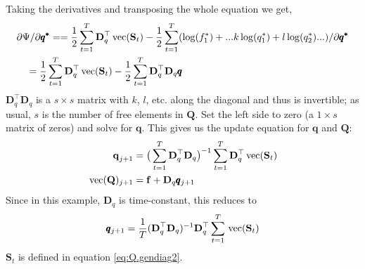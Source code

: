 \documentclass[]{article}
\def\DD{\mbox{$\mathbf D$}}	\def\dd{\mbox{$\mathbf d$}}
\def\QQ{\mbox{$\mathbf Q$}}	 \def\qq{\mbox{$\mathbf q$}}
\def\SS{\mbox{$\mathbf S$}}
\def\vec{\,\textup{\textrm{vec}}}
\begin{document}
Taking the derivatives and transposing the whole equation we get,
\begin{equation}\label{eq:Q.gendiag4}
\begin{split}
&\partial\Psi/\partial\pmb{q^{*}} = 
= \frac{1}{2} \sum_{t=1}^T\DD_q^\top \vec(\SS_t) - \frac{1}{2}\sum_{t=1}^T(\log(f^{*}_1) + ... k\log(q^{*}_1) + l\log(q^{*}_2)...)/\partial\pmb{q^{*}}\\
&\quad = \frac{1}{2} \sum_{t=1}^T\DD_q^\top \vec(\SS_t) - \frac{1}{2}\sum_{t=1}^T\DD_q^\top\DD_q\pmb{q}
\end{split}
\end{equation}
$\DD_q^\top\DD_q$ is a $s \times s$ matrix with $k$, $l$, etc. along the diagonal and thus is invertible; as usual, $s$ is the number of free elements in $\QQ$.  Set the left side to zero (a $1 \times s$ matrix of zeros) and solve for $\pmb{q}$.  This gives us the update equation for $\qq$ and $\QQ$:
\begin{equation}\label{eq:Q.diag.update}
\begin{split}
\qq_{j+1} &= \big(\sum_{t=1}^T\DD_q^\top\DD_q\big)^{-1}\sum_{t=1}^T\DD_q^\top\vec(\SS_t)\\
\vec(\QQ)_{j+1} &= \ff + \DD_q\pmb{q}_{j+1}
\end{split}
\end{equation}
Since in this example, $\DD_q$ is time-constant, this reduces to 
\begin{equation*}
\pmb{q}_{j+1} = \frac{1}{T}(\DD_q^\top\DD_q)^{-1}\DD_q^\top\sum_{t=1}^T\vec(\SS_t)
\end{equation*}
$\SS_t$ is defined in equation \ref{eq:Q.gendiag2}.
\end{document}
